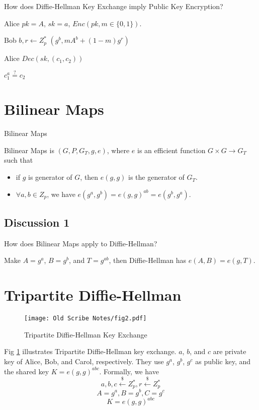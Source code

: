 How does Diffie-Hellman Key Exchange imply Public Key Encryption?


Alice
$pk = A$, $sk = a$, $Enc(pk, m \in \{0, 1\})$.

Bob
$b,r \gets Z^*_p$
$(g^b, mA^b+(1-m)g^r)$

Alice $Dec(sk, (c_1, c_2))$

$c_1^a \stackrel{?}{=} c_2$




\section{Bilinear Maps}

\begin{definition}{Bilinear Maps}

Bilinear Maps is $(G,P,G_T,g,e)$, where $e$ is an efficient function $G \times G \to G_T$ such that

\begin{itemize}
\item if $g$ is generator of $G$, then $e(g, g)$ is the generator of $G_T$.
\item $\forall a,b \in Z_p$, we have $e(g^a, g^b) = e(g, g)^{ab} = e(g^b, g^a)$.
\end{itemize}

\end{definition}

\subsection{Discussion 1}


How does Bilinear Maps apply to Diffie-Hellman?

Make $A=g^a$, $B=g^b$, and $T=g^{ab}$, then Diffie-Hellman has $e(A, B)=e(g, T)$.


\section{Tripartite Diffie-Hellman}

\begin{figure}
\label{fig:3dh}
\centering
  \texttt{[image: Old Scribe Notes/fig2.pdf]}
\caption{Tripartite Diffie-Hellman Key Exchange}
\end{figure}

Fig \ref{fig:3dh} illustrates Tripartite Diffie-Hellman key exchange. $a$, $b$, and $c$ are private key of Alice, Bob, and Carol, respectively.
They use $g^a$, $g^b$, $g^c$ as public key, and the shared key $K=e(g,g)^{abc}$.
Formally, we have
$$a,b,c \stackrel{\$}{\gets} Z^*_p, r \stackrel{\$}{\gets} Z^*_p$$
$$A=g^a, B=g^b, C=g^c$$
$$K=e(g,g)^{abc}$$



